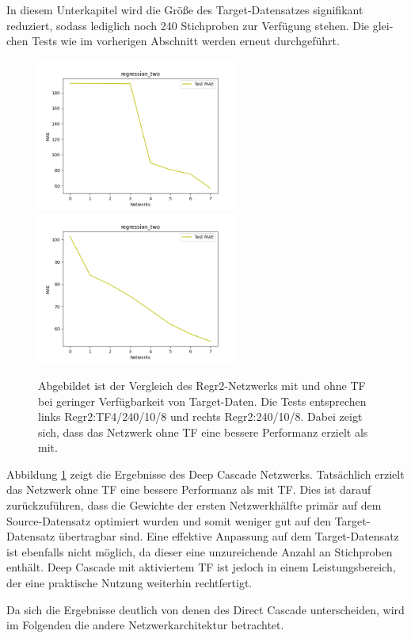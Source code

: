 In diesem Unterkapitel wird die Größe des Target-Datensatzes signifikant reduziert, sodass lediglich noch 240 Stichproben zur Verfügung stehen. 
Die glei-chen Tests wie im vorherigen Abschnitt werden erneut durchgeführt.

\begin{figure}[htpb]
    \includegraphics[height=5cm]{../../Plots/ba_plots/regression_small/regr2_ts.png}
    \includegraphics[height=5cm]{../../Plots/ba_plots/regression_small/woregr2_ts.png}
    \caption{\label{fig:smallregr} 
    \small{Abgebildet ist der Vergleich des Regr2-Netzwerks mit und ohne TF bei geringer Verfügbarkeit von Target-Daten. Die Tests entsprechen 
    links Regr2:TF4/240/10/8 und rechts Regr2:240/10/8. Dabei zeigt sich, dass das Netzwerk ohne TF eine bessere Performanz 
    erzielt als mit.}}
\end{figure}

Abbildung \ref{fig:smallregr} zeigt die Ergebnisse des Deep Cascade Netzwerks. Tatsächlich erzielt das Netzwerk ohne TF eine 
bessere Performanz als mit TF. Dies ist darauf zurückzuführen, dass die Gewichte der ersten Netzwerkhälfte primär auf dem 
Source-Datensatz optimiert wurden und somit weniger gut auf den Target-Datensatz übertragbar sind. 
Eine effektive Anpassung auf dem Target-Datensatz ist ebenfalls nicht möglich, da dieser eine unzureichende Anzahl an Stichproben enthält. 
Deep Cascade mit aktiviertem TF ist jedoch in einem Leistungsbereich, der eine praktische Nutzung weiterhin rechtfertigt.

Da sich die Ergebnisse deutlich von denen des Direct Cascade unterscheiden, wird im Folgenden die andere Netzwerkarchitektur betrachtet.


